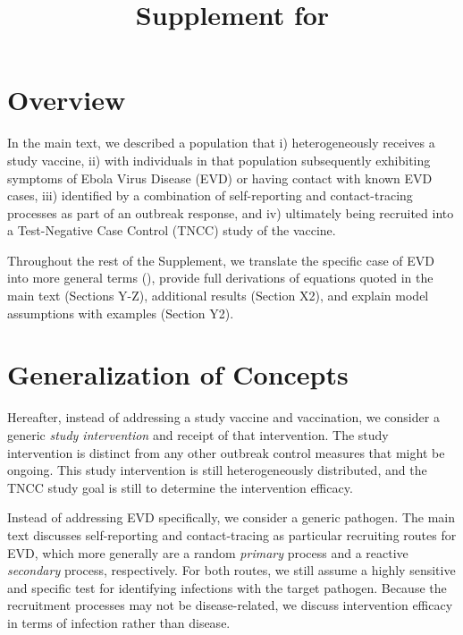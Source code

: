 \documentclass{article}
\begin{document}


\title{Supplement for \partitle}

\maketitle

\clearpage

\tableofcontents

\clearpage

\section{Overview}

In the main text, we described a population that i) heterogeneously receives a study vaccine, ii) with individuals in that population subsequently exhibiting symptoms of Ebola Virus Disease (EVD) or having contact with known EVD cases, iii) identified by a combination of self-reporting and contact-tracing processes as part of an outbreak response, and iv) ultimately being recruited into a Test-Negative Case Control (TNCC) study of the vaccine.

Throughout the rest of the Supplement, we translate the specific case of EVD into more general terms (), provide full derivations of equations quoted in the main text (Sections Y-Z), additional results (Section X2), and explain model assumptions with examples (Section Y2).

\section{Generalization of Concepts}\label{generalizationsection}

Hereafter, instead of addressing a study vaccine and vaccination, we consider a generic {\em study intervention} and receipt of that intervention. The study intervention is distinct from any other outbreak control measures that might be ongoing. This study intervention is still heterogeneously distributed, and the TNCC study goal is still to determine the intervention efficacy.

Instead of addressing EVD specifically, we consider a generic pathogen. The main text discusses self-reporting and contact-tracing as particular recruiting routes for EVD, which more generally are a random {\em primary} process and a reactive {\em secondary} process, respectively. For both routes, we still assume a highly sensitive and specific test for identifying infections with the target pathogen. Because the recruitment processes may not be disease-related, we discuss intervention efficacy in terms of infection rather than disease.
\end{document}
